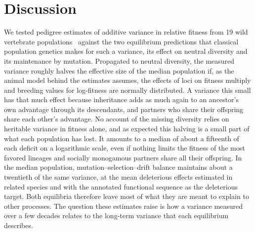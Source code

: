 \documentclass{article}
\begin{document}
\section{Discussion}
We tested pedigree estimates of additive variance in relative fitness from 19 wild vertebrate populations~\cite{bonnet2022} against the two equilibrium predictions that classical population genetics makes for such a variance, its effect on neutral diversity and its maintenance by mutation. Propagated to neutral diversity, the measured variance roughly halves the effective size of the median population if, as the animal model behind the estimates assumes, the effects of loci on fitness multiply and breeding values for log-fitness are normally distributed. A variance this small has that much effect because inheritance adds as much again to an ancestor's own advantage through its descendants, and partners who share their offspring share each other's advantage. No account of the missing diversity relies on heritable variance in fitness alone, and as expected this halving is a small part of what each population has lost. It amounts to a median of about a fifteenth of each deficit on a logarithmic scale, even if nothing limits the fitness of the most favored lineages and socially monogamous partners share all their offspring. In the median population, mutation--selection--drift balance maintains about a twentieth of the same variance, at the mean deleterious effects estimated in related species and with the annotated functional sequence as the deleterious target. Both equilibria therefore leave most of what they are meant to explain to other processes. The question these estimates raise is how a variance measured over a few decades relates to the long-term variance that each equilibrium describes.
\end{document}

